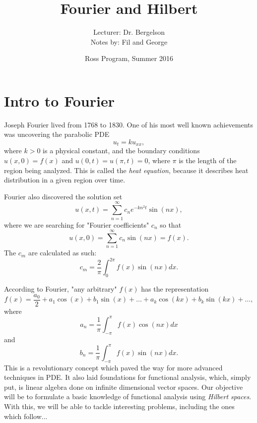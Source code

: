 \documentclass{article}
\title{Fourier and Hilbert}
\author{Lecturer: Dr. Bergelson \\
Notes by: Fil and George}
\date{Ross Program, Summer 2016}
\begin{document}
\maketitle

\section{Intro to Fourier}

Joseph Fourier lived from 1768 to 1830. One of his most well known achievements was uncovering the parabolic PDE 
\begin{equation}
    u_{t} = ku_{xx},
\end{equation}
where $k>0$ is a physical constant, and the boundary conditions $u(x,0) = f(x)$ and $u(0,t) = u(\pi, t) = 0$, where $\pi$ is the length of the region being analyzed. This is called the \textit{heat equation}, because it describes heat distribution in a given region over time.

Fourier also discovered the solution set
\begin{equation}
    u(x,t) = \sum_{n=1}^{\infty} c_{n} e^{-kn^{2}t}\sin(nx),
\end{equation}
where we are searching for "Fourier coefficients" $c_{n}$ so that 
\begin{equation}
u(x,0) = \sum_{n=1}^{\infty} c_{n}\sin(nx) = f(x).
\end{equation}
The $c_{m}$ are calculated as such:
\begin{equation}
c_{m} = \frac{2}{\pi} \int_{0}^{2\pi} f(x)\sin(nx) dx.
\end{equation}

According to Fourier, "any arbitrary" $f(x)$ has the representation 
\begin{equation}
f(x) = \frac{a_{0}}{2} + a_{1}\cos(x) + b_{1}\sin(x) + \ldots + a_{k}\cos(kx) + b_{k}\sin(kx) + \ldots ,
\end{equation}
where 
\begin{equation}
a_{n} = \frac{1}{\pi} \int_{-\pi}^{\pi} f(x)\cos(nx) dx
\end{equation}
and
\begin{equation}
b_{n} = \frac{1}{\pi} \int_{-\pi}^{\pi} f(x)\sin(nx) dx.
\end{equation}
This is a revolutionary concept which paved the way for more advanced techniques in PDE. It also laid foundations for functional analysis, which, simply put, is linear algebra done on infinite dimensional vector spaces. Our objective will be to formulate a basic knowledge of functional analysis using \textit{Hilbert spaces}. With this, we will be able to tackle interesting problems, including the ones which follow...
\end{document}
